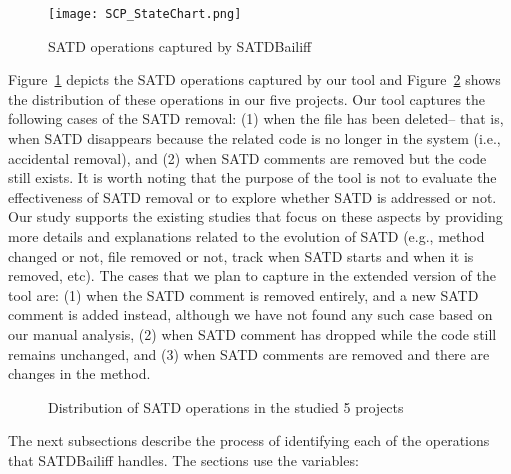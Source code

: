 \documentclass[3p]{elsarticle}
\newcommand{\approach}{SATDBailiff\xspace}
\begin{document}
\begin{figure}
    \centering
    \texttt{[image: SCP\_StateChart.png]}
    \caption{SATD operations captured by \approach}
    \label{fig:statechart}
\end{figure}


Figure~\ref{fig:statechart} depicts the SATD operations captured by our tool and Figure~\ref{fig:satdoperation} shows the distribution  of these operations in our five projects. Our tool captures the following cases of the SATD removal: (1) when the file has been deleted-- that is, when SATD disappears because the related code is no longer in the system (i.e., accidental removal), and (2) when SATD comments are removed but the code still exists. 
It is worth noting that the purpose of the tool is not to evaluate the effectiveness of SATD removal or to explore whether SATD is addressed or not. Our study supports the existing studies that focus on these aspects by providing more details and explanations related to the evolution of SATD (e.g., method changed or not, file removed or not, track when SATD starts and when it is removed, etc). 
The cases that we plan to capture in the extended version of the tool are: (1) when the SATD comment is removed entirely, and a new SATD comment is added instead, although we have not found any such case based on our manual analysis, (2) when SATD comment has dropped while the code still remains unchanged, and (3) when SATD comments are removed and there are changes in the method.

\begin{figure}[h]
\centering 
{}
\caption{Distribution of SATD operations in the studied 5 projects}
\label{fig:satdoperation}
\end{figure}

The next subsections describe the process of identifying each of the operations that \approach handles. The sections use the variables:
\end{document}
